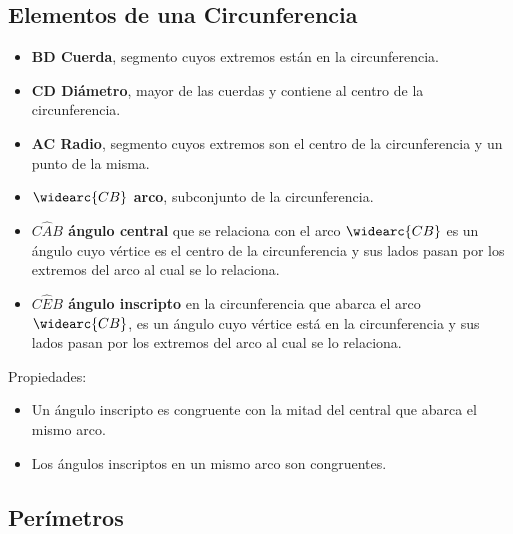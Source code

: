 \documentclass[10pt]{article}
\begin{document}
\subsection{Elementos de una Circunferencia}
\begin{multicols}{2}
\begin{itemize}
\item \textbf{BD Cuerda}, segmento cuyos extremos están en la circunferencia.
\item \textbf{CD Diámetro}, mayor de las cuerdas y contiene al centro de la circunferencia.
\item \textbf{AC Radio}, segmento cuyos extremos son el centro de la circunferencia y un punto de la misma.
\item \textbf{$\widearc{CB}$ arco}, subconjunto de la circunferencia.
\end{itemize}
\end{multicols}
\begin{itemize}
\item \textbf{$C\hat{A}B$ ángulo central} que se relaciona con el arco $\widearc{CB}$ es un ángulo cuyo vértice es el centro de la circunferencia y sus lados pasan por los extremos del arco al cual se lo relaciona.
\item \textbf{$C\hat{E}B$ ángulo inscripto} en la circunferencia que abarca el arco $\widearc{CB}$, es un ángulo cuyo vértice está en la circunferencia y sus lados pasan por los extremos del arco al cual se lo relaciona.
\end{itemize}
Propiedades:
\begin{itemize}
\item {} Un ángulo inscripto es congruente con la mitad del central que abarca el mismo arco.
\item {} Los ángulos inscriptos en un mismo arco son congruentes.\\
\end{itemize}
\newpage
\subsection{Perímetros}
\end{document}
